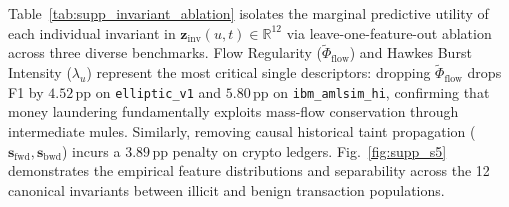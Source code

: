 \documentclass[a4paper,fleqn,twocolumn]{article}
\begin{document}
Table~\ref{tab:supp_invariant_ablation} isolates the marginal predictive utility of each individual invariant in $\mathbf{z}_{\text{inv}}(u, t) \in \mathbb{R}^{12}$ via leave-one-feature-out ablation across three diverse benchmarks. Flow Regularity ($\tilde{\Phi}_{\text{flow}}$) and Hawkes Burst Intensity ($\lambda_u$) represent the most critical single descriptors: dropping $\tilde{\Phi}_{\text{flow}}$ drops F1 by $4.52$\,pp on \texttt{elliptic\_v1} and $5.80$\,pp on \texttt{ibm\_amlsim\_hi}, confirming that money laundering fundamentally exploits mass-flow conservation through intermediate mules. Similarly, removing causal historical taint propagation ($\mathbf{s}_{\text{fwd}}, \mathbf{s}_{\text{bwd}}$) incurs a $3.89$\,pp penalty on crypto ledgers. Fig.~\ref{fig:supp_s5} demonstrates the empirical feature distributions and separability across the 12 canonical invariants between illicit and benign transaction populations.
\end{document}
